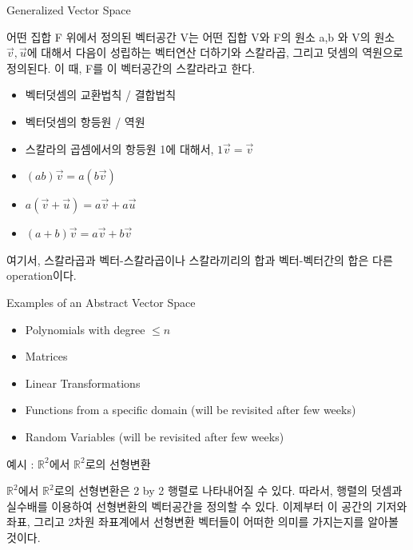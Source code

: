 \documentclass{beamer}
\begin{document}
\begin{frame}{Generalized Vector Space} 

어떤 집합 F 위에서 정의된 벡터공간 V는 어떤 집합 V와 F의 원소 a,b 와 V의 원소 $\vec{v}, \vec{u}$에 대해서 다음이 성립하는 벡터연산 더하기와 스칼라곱, 그리고 덧셈의 역원으로 정의된다. 이 때, F를 이 벡터공간의 스칼라라고 한다. 

\begin{itemize} 
\item 벡터덧셈의 교환법칙 / 결합법칙 
\item 벡터덧셈의 항등원 / 역원
\item 스칼라의 곱셈에서의 항등원 1에 대해서, $1\vec{v} = \vec{v}$
\item $(ab)\vec{v} = a(b\vec{v})$ 
\item $a(\vec{v} + \vec{u}) = a\vec{v} + a\vec{u} $
\item $(a+b)\vec{v} = a\vec{v} + b\vec{v}$
\end{itemize}

여기서, 스칼라곱과 벡터-스칼라곱이나 스칼라끼리의 합과 벡터-벡터간의 합은 다른 operation이다. 

\end{frame}

\begin{frame}{Examples of an Abstract Vector Space} 
\begin{itemize} 
\item Polynomials with degree $\leq n$
\item Matrices
\item Linear Transformations
\item Functions from a specific domain (will be revisited after few weeks)
\item Random Variables (will be revisited after few weeks)
\end{itemize}
\end{frame}

\begin{frame}{예시 : $\mathds{R}^2$에서 $\mathds{R}^2$로의 선형변환}

$\mathds{R}^2$에서 $\mathds{R}^2$로의 선형변환은 2 by 2 행렬로 나타내어질 수 있다. 따라서, 행렬의 덧셈과 실수배를 이용하여 선형변환의 벡터공간을 정의할 수 있다. 이제부터 이 공간의 기저와 좌표, 그리고 2차원 좌표계에서 선형변환 벡터들이 어떠한 의미를 가지는지를 알아볼 것이다. 

\end{frame}
\end{document}
